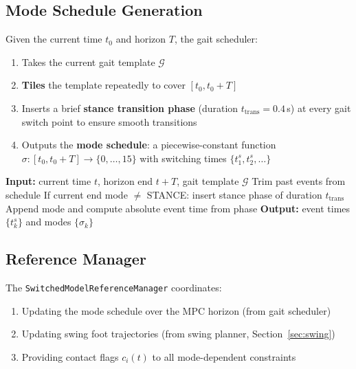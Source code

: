 \documentclass[11pt,a4paper]{article}
\begin{document}
\subsection{Mode Schedule Generation}
\label{sec:mode_schedule}

Given the current time $t_0$ and horizon $T$, the gait scheduler:
\begin{enumerate}
	\item Takes the current gait template $\mathcal{G}$
	\item \textbf{Tiles} the template repeatedly to cover $[t_0, t_0 + T]$
	\item Inserts a brief \textbf{stance transition phase} (duration $t_{\text{trans}} = 0.4$\,s) at every gait switch point to ensure smooth transitions
	\item Outputs the \textbf{mode schedule}: a piecewise-constant function $\sigma: [t_0, t_0+T] \to \{0, \ldots, 15\}$ with switching times $\{t_1^s, t_2^s, \ldots\}$
\end{enumerate}

\begin{algorithm}
	\caption{Mode Schedule Generation (\texttt{GaitSchedule::getModeSchedule})}
	\begin{algorithmic}[1]
		\STATE \textbf{Input:} current time $t$, horizon end $t + T$, gait template $\mathcal{G}$
		\STATE Trim past events from schedule
		\STATE If current end mode $\neq$ STANCE: insert stance phase of duration $t_{\text{trans}}$
		\STATE Append mode and compute absolute event time from phase
		\ENDFOR
		\ENDWHILE
		\STATE \textbf{Output:} event times $\{t_k^s\}$ and modes $\{\sigma_k\}$
	\end{algorithmic}
\end{algorithm}

\subsection{Reference Manager}

The \texttt{SwitchedModelReferenceManager} coordinates:
\begin{enumerate}
	\item Updating the mode schedule over the MPC horizon (from gait scheduler)
	\item Updating swing foot trajectories (from swing planner, Section~\ref{sec:swing})
	\item Providing contact flags $c_i(t)$ to all mode-dependent constraints
\end{enumerate}
\end{document}
